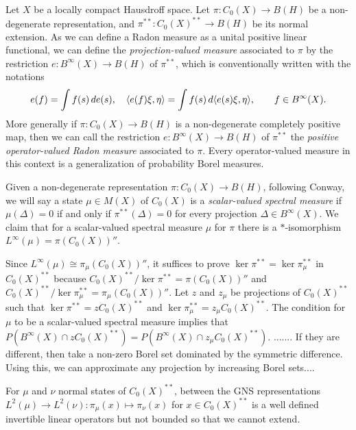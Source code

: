 \documentclass{../../large}
\begin{document}
\begin{prb}
Let $X$ be a locally compact Hausdroff space.
Let $\pi:C_0(X)\to B(H)$ be a non-degenerate representation, and $\pi^{**}:C_0(X)^{**}\to B(H)$ be its normal extension.
As we can define a Radon measure as a unital positive linear functional, we can define the \emph{projection-valued measure} associated to $\pi$ by the restriction $e:B^\infty(X)\to B(H)$ of $\pi^{**}$, which is conventionally written with the notations
\[e(f)=\int f(s)\,de(s),\quad
\langle e(f)\xi,\eta\rangle=\int f(s)\,d\langle e(s)\xi,\eta\rangle,\qquad f\in B^\infty(X).\]
More generally if $\pi:C_0(X)\to B(H)$ is a non-degenerate completely positive map, then we can call the restriction $e:B^\infty(X)\to B(H)$ of $\pi^{**}$ the \emph{positive operator-valued Radon measure} associated to $\pi$.
Every operator-valued measure in this context is a generalization of probability Borel measures.





Given a non-degenerate representation $\pi:C_0(X)\to B(H)$, following Conway, we will say a state $\mu\in M(X)$ of $C_0(X)$ is a \emph{scalar-valued spectral measure} if $\mu(\Delta)=0$ if and only if $\pi^{**}(\Delta)=0$ for every projection $\Delta\in B^\infty(X)$.
We claim that for a scalar-valued spectral measure $\mu$ for $\pi$ there is a $*$-isomorphism $L^\infty(\mu)=\pi(C_0(X))''$.

Since $L^\infty(\mu)\cong\pi_\mu(C_0(X))''$, it suffices to prove $\ker\pi^{**}=\ker\pi_\mu^{**}$ in $C_0(X)^{**}$ because $C_0(X)^{**}/\ker\pi^{**}=\pi(C_0(X))''$ and $C_0(X)^{**}/\ker\pi_\mu^{**}=\pi_\mu(C_0(X))''$.
Let $z$ and $z_\mu$ be projections of $C_0(X)^{**}$ such that $\ker\pi^{**}=zC_0(X)^{**}$ and $\ker\pi_\mu^{**}=z_\mu C_0(X)^{**}$.
The condition for $\mu$ to be a scalar-valued spectral measure implies that $P(B^\infty(X)\cap zC_0(X)^{**})=P(B^\infty(X)\cap z_\mu C_0(X)^{**})$.
.......
If they are different, then take a non-zero Borel set dominated by the symmetric difference.
Using this, we can approximate any projection by increasing Borel sets....

For $\mu$ and $\nu$ normal states of $C_0(X)^{**}$, between the GNS representations $L^2(\mu)\to L^2(\nu):\pi_\mu(x)\mapsto\pi_\nu(x)$ for $x\in C_0(X)^{**}$ is a well defined invertible linear operators but not bounded so that we cannot extend.



\end{prb}
\end{document}
